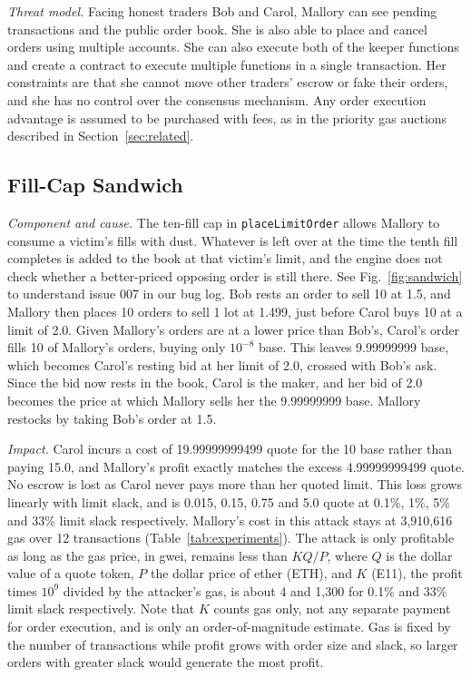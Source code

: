 \emph{Threat model.}
Facing honest traders Bob and Carol, Mallory can see pending transactions and the public order book.
She is also able to place and cancel orders using multiple accounts.
She can also execute both of the keeper functions and create a contract to execute multiple functions in a single transaction. %
Her constraints are that she cannot move other traders' escrow or fake their orders, and she has no control over the consensus mechanism. %
Any order execution advantage is assumed to be purchased with fees, as in the priority gas auctions described in Section~\ref{sec:related}. %

\subsection{Fill-Cap Sandwich}\label{sec:c1}
\emph{Component and cause.}
The ten-fill cap in \texttt{placeLimitOrder} allows Mallory to consume a victim's fills with dust. %
Whatever is left over at the time the tenth fill completes is added to the book at that victim's limit, and the engine does not check whether a better-priced opposing order is still there. %
See Fig.~\ref{fig:sandwich} to understand issue 007 in our bug log. %
Bob rests an order to sell 10 at 1.5, and Mallory then places 10 orders to sell 1 lot at 1.499, just before Carol buys 10 at a limit of 2.0. %
Given Mallory's orders are at a lower price than Bob's, Carol's order fills 10 of Mallory's orders, buying only $10^{-8}$ base. %
This leaves 9.99999999 base, which becomes Carol's resting bid at her limit of 2.0, crossed with Bob's ask. %
Since the bid now rests in the book, Carol is the maker, and her bid of 2.0 becomes the price at which Mallory sells her the 9.99999999 base. %
Mallory restocks by taking Bob's order at 1.5. %



\emph{Impact.}
Carol incurs a cost of 19.99999999499 quote for the 10 base rather than paying 15.0, and Mallory's profit exactly matches the excess 4.99999999499 quote. %
No escrow is lost as Carol never pays more than her quoted limit. %
This loss grows linearly with limit slack, and is 0.015, 0.15, 0.75 and 5.0 quote at 0.1\%, 1\%, 5\% and 33\% limit slack respectively. %
Mallory's cost in this attack stays at 3{,}910{,}616 gas over 12 transactions (Table~\ref{tab:experiments}). %
The attack is only profitable as long as the gas price, in gwei, remains less than $KQ/P$, where $Q$ is the dollar value of a quote token, $P$ the dollar price of ether (ETH), and $K$ (E11), the profit times $10^{9}$ divided by the attacker's gas, is about 4 and 1{,}300 for 0.1\% and 33\% limit slack respectively. %
Note that $K$ counts gas only, not any separate payment for order execution, and is only an order-of-magnitude estimate. %
Gas is fixed by the number of transactions while profit grows with order size and slack, so larger orders with greater slack would generate the most profit. %

